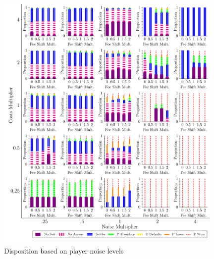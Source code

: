 \documentclass{article}
\begin{document}
\begin{figure}
    \centering
    \begin{minipage}{0.48\textwidth}
        \centering
        \includegraphics[width=0.98\textwidth, scale=0.70, trim={0in 0in 0in 0in}, clip]{../Figures/Disposition Varying Noise Multiplier} %
        \caption{Disposition based on player noise levels}
		\label{fig:dispositions_playernoise}
    \end{minipage}\hfill
    \begin{minipage}{0.48\textwidth}
        \centering

\end{minipage}
\end{figure}
\end{document}
